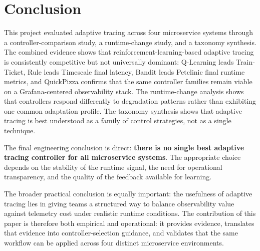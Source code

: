 \documentclass[10pt,twocolumn]{article}
\begin{document}
\section{Conclusion}
This project evaluated adaptive tracing across four microservice systems through a controller-comparison study, a runtime-change study, and a taxonomy synthesis. The combined evidence shows that reinforcement-learning-based adaptive tracing is consistently competitive but not universally dominant: Q-Learning leads Train-Ticket, Rule leads Timescale final latency, Bandit leads Petclinic final runtime metrics, and QuickPizza confirms that the same controller families remain viable on a Grafana-centered observability stack. The runtime-change analysis shows that controllers respond differently to degradation patterns rather than exhibiting one common adaptation profile. The taxonomy synthesis shows that adaptive tracing is best understood as a family of control strategies, not as a single technique.

The final engineering conclusion is direct: \textbf{there is no single best adaptive tracing controller for all microservice systems}. The appropriate choice depends on the stability of the runtime signal, the need for operational transparency, and the quality of the feedback available for learning.

The broader practical conclusion is equally important: the usefulness of adaptive tracing lies in giving teams a structured way to balance observability value against telemetry cost under realistic runtime conditions. The contribution of this paper is therefore both empirical and operational: it provides evidence, translates that evidence into controller-selection guidance, and validates that the same workflow can be applied across four distinct microservice environments.

\clearpage
\onecolumn
\end{document}
